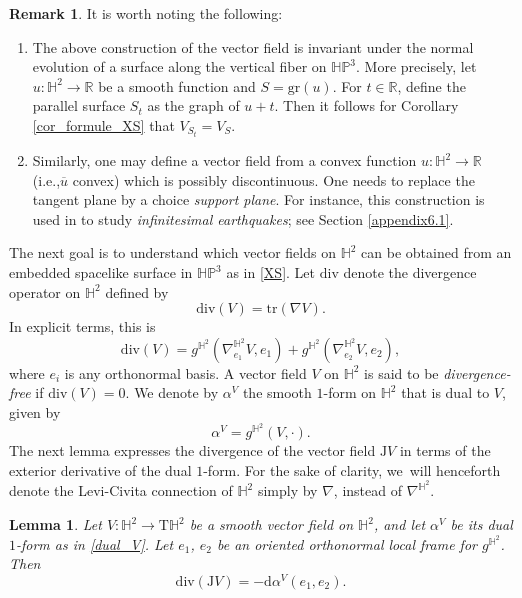 \documentclass[11pt]{article}
\newcommand{\ie}{i.e.,\xspace}
\theoremstyle{plain}
\newtheorem{lemma}[cor]{Lemma}
\theoremstyle{definition}
\newtheorem{remark}[cor]{Remark}
\newcommand{\HP}{\mathbb{HP}^3}
\begin{document}
\begin{remark}
It is worth noting the following:
\begin{enumerate}
\item The above construction of the vector field is invariant under the normal evolution of a surface along the vertical fiber on $\HP$. More precisely, let $u:\mathbb{H}^2\to\mathbb{R}$ be a smooth function and $S=\mathrm{gr}(u)$. For $t\in\mathbb{R}$, define the parallel surface $S_t$ as the graph of $u+t$. Then it follows for Corollary \ref{cor_formule_XS} that $V_{S_t}=V_S$.
\item Similarly, one may define a vector field from a convex function $u:\mathbb{H}^2\to\mathbb{R}$ (\ie $\overline{u}$ convex) which is possibly discontinuous. One needs to replace the tangent plane by a choice \emph{support plane}. For instance, this construction is used in \cite{diaf2023Infearth} to study \emph{infinitesimal earthquakes}; see Section \ref{appendix6.1}.
\end{enumerate}
\end{remark}
The next goal is to understand which vector fields on $\mathbb{H}^2$ can be obtained from an embedded spacelike surface in $\HP$ as in \eqref{XS}. Let $\mathrm{div}$ denote the divergence operator on $\mathbb{H}^2$ defined by
\[
\mathrm{div}(V)=\mathrm{tr}(\nabla V).
\]
In explicit terms, this is
\begin{equation}\label{formula_divergence}
\mathrm{div}(V)=g^{\mathbb{H}^2}(\nabla^{\mathbb{H}^2}_{e_1}V,e_1)+g^{\mathbb{H}^2}(\nabla^{\mathbb{H}^2}_{e_2}V,e_2),
\end{equation} where $e_i$ is any orthonormal basis. A vector field \(V \) on \(\mathbb{H}^2 \) is said to be \emph{divergence-free} if \(\mathrm{div}(V) = 0 \).
We denote by \(\alpha^V \) the smooth $1$-form on \(\mathbb{H}^2 \) that is dual to \(V \), given by
\begin{equation}\label{dual_V}
\alpha^V = g^{\mathbb{H}^2}(V, \cdot).
\end{equation}
The next lemma expresses the divergence of the vector field \(\mathrm{J}V \) in terms of the exterior derivative of the dual $1$-form.
For the sake of clarity, we~will henceforth denote the Levi-Civita connection of \(\mathbb{H}^2 \) simply by \(\nabla \), instead of \(\nabla^{\mathbb{H}^2} \).

\begin{lemma}\label{divergence_in_terms_of_forms}
Let \(V: \mathbb{H}^2 \to \mathrm{T}\mathbb{H}^2 \) be a smooth vector field on \(\mathbb{H}^2 \), and let \(\alpha^V \) be its dual $1$-form as in \eqref{dual_V}.
Let \(e_1 \), \(e_2 \) be an oriented orthonormal local frame for \(g^{\mathbb{H}^2} \). Then
\[
\mathrm{div}(\mathrm{J}V) =- \mathrm{d} \alpha^V(e_1, e_2).
\]
\end{lemma}
\end{document}
